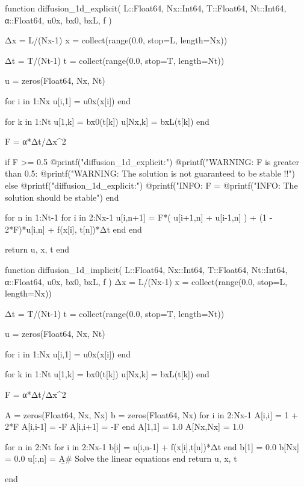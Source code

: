 \documentclass[a4paper,11pt]{article}
\begin{document}
\begin{juliacode}
function diffusion_1d_explicit(
    L::Float64, Nx::Int64, T::Float64, Nt::Int64,
    α::Float64, u0x, bx0, bxL, f
)
    
    Δx = L/(Nx-1)
    x = collect(range(0.0, stop=L, length=Nx))
    
    Δt = T/(Nt-1)
    t = collect(range(0.0, stop=T, length=Nt))

    u = zeros(Float64, Nx, Nt)
    
    for i in 1:Nx
        u[i,1] = u0x(x[i])
    end
    
    for k in 1:Nt
        u[1,k] = bx0(t[k])
        u[Nx,k] = bxL(t[k])
    end
    
    F = α*Δt/Δx^2
    
    if F >= 0.5
        @printf("diffusion_1d_explicit:\n")
        @printf("WARNING: F is greater than 0.5: %
        @printf("WARNING: The solution is not guaranteed to be stable !!\n")
    else
        @printf("diffusion_1d_explicit:\n")
        @printf("INFO: F = %
        @printf("INFO: The solution should be stable\n")
    end

    for n in 1:Nt-1
        for i in 2:Nx-1
            u[i,n+1] = F*( u[i+1,n] + u[i-1,n] ) + (1 - 2*F)*u[i,n] + f(x[i], t[n])*Δt
        end
    end
    
    return u, x, t
end
\end{juliacode}



\begin{juliacode}
function diffusion_1d_implicit(
    L::Float64, Nx::Int64, T::Float64, Nt::Int64,
    α::Float64, u0x, bx0, bxL, f
)
    Δx = L/(Nx-1)
    x = collect(range(0.0, stop=L, length=Nx))

    Δt = T/(Nt-1)
    t = collect(range(0.0, stop=T, length=Nt))

    u = zeros(Float64, Nx, Nt)

    for i in 1:Nx
        u[i,1] = u0x(x[i])
    end

    for k in 1:Nt
        u[1,k] = bx0(t[k])
        u[Nx,k] = bxL(t[k])
    end

    F = α*Δt/Δx^2
    
    A = zeros(Float64, Nx, Nx)
    b = zeros(Float64, Nx)
    for i in 2:Nx-1
        A[i,i] = 1 + 2*F
        A[i,i-1] = -F
        A[i,i+1] = -F
    end
    A[1,1] = 1.0
    A[Nx,Nx] = 1.0

    for n in 2:Nt
        for i in 2:Nx-1
            b[i] = u[i,n-1] + f(x[i],t[n])*Δt
        end
        b[1] = 0.0
        b[Nx] = 0.0
        u[:,n] = A\b   # Solve the linear equations
    end
    return u, x, t

end
\end{juliacode}
\end{document}
